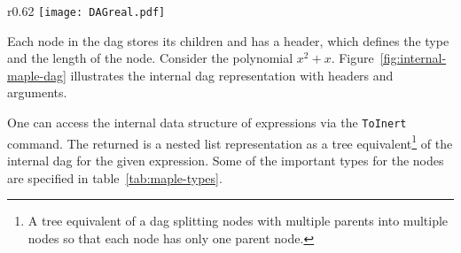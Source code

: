 
\begin{wrapfigure}{r}{0.62\textwidth}
	\vspace{-22pt}
	\centering
	\texttt{[image: DAGreal.pdf]}
	\vspace{-26pt}
	\caption{The internal \Maple{} DAG representation of $x^2+x$.}
	\label{fig:internal-maple-dag}
	\vspace{-15pt}
\end{wrapfigure}

Each node in the \gls*{dag} stores its children and has a header, which defines the type and the length of the node. Consider the polynomial $x^2+x$. Figure~\ref{fig:internal-maple-dag} illustrates the internal \gls*{dag} representation with headers and arguments.

One can access the internal data structure of expressions via the \texttt{ToInert} command. The returned \inertF{} is a nested list representation as a tree equivalent\footnote{A tree equivalent of a \gls*{dag} splitting nodes with multiple parents into multiple nodes so that each node has only one parent node.} of the internal \gls*{dag} for the given expression. Some of the important types for the nodes are specified in table~\ref{tab:maple-types}.



